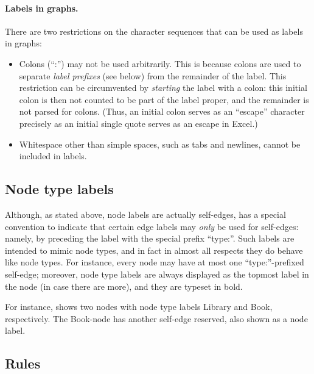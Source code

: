 \paragraph{Labels in graphs.}

There are two restrictions on the character sequences that can be used as
labels in graphs:
\begin{itemize}\noitemsep
\item Colons (``\textsf{:}'') may not be used arbitrarily. This is because
  colons are used to separate \emph{label prefixes} (see below) from the
  remainder of the label. This restriction can be circumvented by
  \emph{starting} the label with a colon: this initial colon is then not
  counted to be part of the label proper, and the remainder is not parsed for
  colons. (Thus, an initial colon serves as an ``escape'' character precisely
  as an initial single quote serves as an escape in Excel.)
\item Whitespace other than simple spaces, such as tabs and newlines, cannot be
  included in labels.
\end{itemize}

\subsection{Node type labels}

Although, as stated above, node labels are actually self-edges, \Groove has a
special convention to indicate that certain edge labels may \emph{only} be used
for self-edges: namely, by preceding the label with the special prefix
``\textsf{type:}''. Such labels are intended to mimic node types, and in fact
in almost all respects they do behave like node types. For instance, every node
may have at most one ``\textsf{type:}''-prefixed self-edge; moreover, node type
labels are always displayed as the topmost label in the node (in case there are
more), and they are typeset in bold.


For instance,  shows two nodes with node type labels
\textsf{Library} and \textsf{Book}, respectively. The \textsf{Book}-node has
another self-edge \textsf{reserved}, also shown as a node label.

\subsection{Rules}

